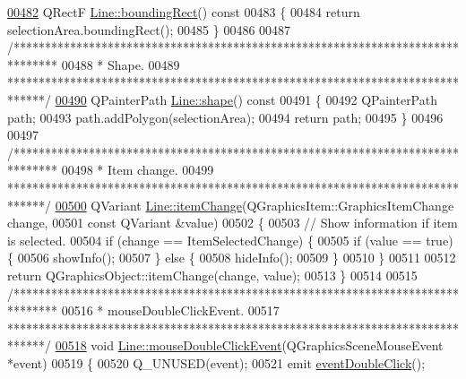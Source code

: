 \begin{DoxyCode}
\hypertarget{line_8cpp_source_l00482}{}\hyperlink{group___models_gad15c3af158d3b966c04be7e18cee5aea}{00482} QRectF \hyperlink{group___models_gad15c3af158d3b966c04be7e18cee5aea}{Line::boundingRect}()\textcolor{keyword}{ const}
00483 \textcolor{keyword}{}\{
00484   \textcolor{keywordflow}{return} selectionArea.boundingRect();
00485 \}
00486 
00487 \textcolor{comment}{/*******************************************************************************}
00488 \textcolor{comment}{ * Shape.}
00489 \textcolor{comment}{ ******************************************************************************/}
\hypertarget{line_8cpp_source_l00490}{}\hyperlink{group___models_gaf1736b829a643d99052ef6428ddd5b16}{00490} QPainterPath \hyperlink{group___models_gaf1736b829a643d99052ef6428ddd5b16}{Line::shape}()\textcolor{keyword}{ const}
00491 \textcolor{keyword}{}\{
00492   QPainterPath path;
00493   path.addPolygon(selectionArea);
00494   \textcolor{keywordflow}{return} path;
00495 \}
00496 
00497 \textcolor{comment}{/*******************************************************************************}
00498 \textcolor{comment}{ * Item change.}
00499 \textcolor{comment}{ ******************************************************************************/}
\hypertarget{line_8cpp_source_l00500}{}\hyperlink{group___models_ga5fcee3f23eb50e34f730d602a3802b93}{00500} QVariant \hyperlink{group___models_ga5fcee3f23eb50e34f730d602a3802b93}{Line::itemChange}(QGraphicsItem::GraphicsItemChange change,
00501                           \textcolor{keyword}{const} QVariant &value)
00502 \{
00503   \textcolor{comment}{// Show information if item is selected.}
00504   \textcolor{keywordflow}{if} (change == ItemSelectedChange) \{
00505     \textcolor{keywordflow}{if} (value == \textcolor{keyword}{true}) \{
00506       showInfo();
00507     \} \textcolor{keywordflow}{else} \{
00508       hideInfo();
00509     \}
00510   \}
00511 
00512   \textcolor{keywordflow}{return} QGraphicsObject::itemChange(change, value);
00513 \}
00514 
00515 \textcolor{comment}{/*******************************************************************************}
00516 \textcolor{comment}{ * mouseDoubleClickEvent.}
00517 \textcolor{comment}{ ******************************************************************************/}
\hypertarget{line_8cpp_source_l00518}{}\hyperlink{group___models_ga9a1fee5b1606ab0deedd04bdab99be70}{00518} \textcolor{keywordtype}{void} \hyperlink{group___models_ga9a1fee5b1606ab0deedd04bdab99be70}{Line::mouseDoubleClickEvent}(QGraphicsSceneMouseEvent *event)
00519 \{
00520   Q\_UNUSED(event);
00521   emit \hyperlink{class_line_a2444b577ea2254994599c6f829c629a5}{eventDoubleClick}();

\end{DoxyCode}
